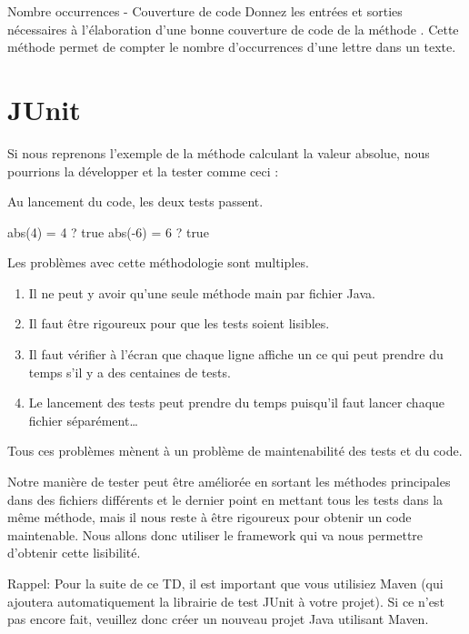 \documentclass[a4paper,11pt]{style-esi/td}
\begin{document}
\begin{Exercice}{Nombre occurrences - Couverture de code}
	Donnez les entrées et sorties nécessaires 
	à l’élaboration d’une bonne couverture de code 
	de la méthode . 
	Cette méthode permet de compter le nombre d'occurrences d’une lettre dans un texte.
\end{Exercice}

\section{JUnit}

Si nous reprenons l’exemple de la méthode calculant la valeur absolue, nous pourrions la développer et la tester comme ceci :

Au lancement du code, les deux tests passent.
\begin{Console}
	abs(4) = 4 ? true
	abs(-6) = 6 ? true
\end{Console}

Les problèmes avec cette méthodologie sont multiples.
\begin{enumerate}
	\item Il ne peut y avoir qu’une seule méthode main par fichier Java.
	\item Il faut être rigoureux pour que les tests soient lisibles.
	\item Il faut vérifier à l'écran que chaque ligne affiche un 
	      ce qui peut prendre du temps s'il y a des centaines de tests.
	\item Le lancement des tests peut prendre du temps
	      puisqu'il faut lancer chaque fichier séparément\dots
\end{enumerate}

Tous ces problèmes mènent à un problème de maintenabilité des tests et du code.

Notre manière de tester peut être améliorée
en sortant les méthodes principales dans des fichiers différents
et le dernier point en mettant tous les tests dans la même méthode,
mais il nous reste à être rigoureux pour obtenir un code maintenable.
Nous allons donc utiliser le framework 
qui va nous permettre d'obtenir cette lisibilité.


Rappel: Pour la suite de ce TD, il est important que vous utilisiez Maven (qui ajoutera automatiquement la librairie de test JUnit à votre projet). Si ce n'est pas encore fait, veuillez donc créer un nouveau projet Java utilisant Maven.
\end{document}
